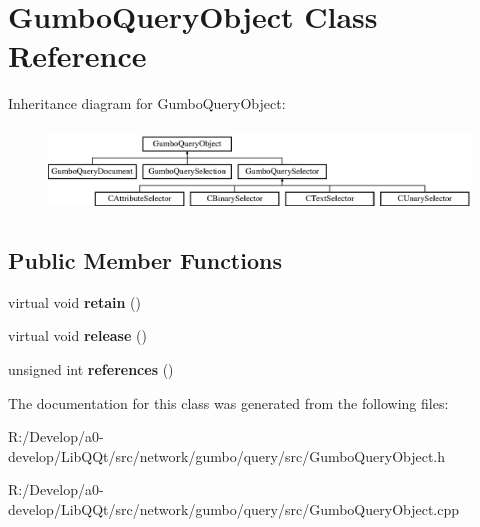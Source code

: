 \hypertarget{class_gumbo_query_object}{}\section{Gumbo\+Query\+Object Class Reference}
\label{class_gumbo_query_object}
Inheritance diagram for Gumbo\+Query\+Object\+:\begin{figure}[H]
\begin{center}
\leavevmode
\includegraphics[height=2.225166cm]{class_gumbo_query_object}
\end{center}
\end{figure}
\subsection*{Public Member Functions}
\begin{DoxyCompactItemize}
\item 
\mbox{\label{class_gumbo_query_object_a8ed1ce41cc3ee3505ccf42361f5253ea}} 
virtual void {\bfseries retain} ()
\item 
\mbox{\label{class_gumbo_query_object_aa4097da833af5327024965490bd9ce1c}} 
virtual void {\bfseries release} ()
\item 
\mbox{\label{class_gumbo_query_object_a4b4d3d9c02b0233d03b668cbeff4a3a1}} 
unsigned int {\bfseries references} ()
\end{DoxyCompactItemize}


The documentation for this class was generated from the following files\+:\begin{DoxyCompactItemize}
\item 
R\+:/\+Develop/a0-\/develop/\+Lib\+Q\+Qt/src/network/gumbo/query/src/Gumbo\+Query\+Object.\+h\item 
R\+:/\+Develop/a0-\/develop/\+Lib\+Q\+Qt/src/network/gumbo/query/src/Gumbo\+Query\+Object.\+cpp\end{DoxyCompactItemize}
